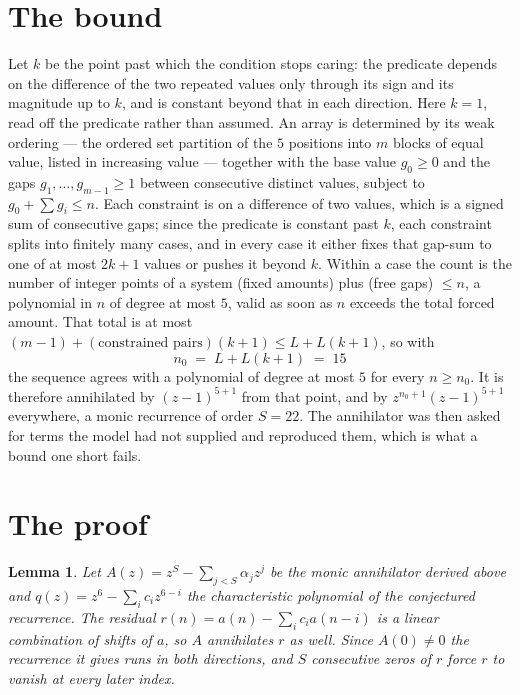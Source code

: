 \documentclass[11pt,a4paper]{article}
\theoremstyle{plain}
\newtheorem{lemma}[theorem]{Lemma}
\theoremstyle{definition}
\begin{document}
\section{The bound}

Let $k$ be the point past which the condition stops caring: the predicate depends on the
difference of the two repeated values only through its sign and its magnitude up to $k$, and is
constant beyond that in each direction. Here $k=1$, read off the predicate rather than
assumed. An array is determined by its weak ordering --- the ordered set partition of the
$5$ positions into $m$ blocks of equal value, listed in increasing value --- together with
the base value $g_0\ge0$ and the gaps $g_1,\dots,g_{m-1}\ge1$ between consecutive distinct
values, subject to $g_0+\sum g_i\le n$. Each constraint is on a difference of two values, which
is a signed sum of consecutive gaps; since the predicate is constant past $k$, each constraint
splits into finitely many cases, and in every case it either fixes that gap-sum to one of at
most $2k+1$ values or pushes it beyond $k$. Within a case the count is the number of integer
points of a system (fixed amounts) plus (free gaps) $\le n$, a polynomial in $n$ of degree at
most $5$, valid as soon as $n$ exceeds the total forced amount. That total is at most
$(m-1)+(\text{constrained pairs})(k+1)\le L+L(k+1)$, so with
\[
n_0 \;=\; L + L(k+1) \;=\; 15
\]
the sequence agrees with a polynomial of degree at most $5$ for every $n\ge n_0$. It is
therefore annihilated by $(z-1)^{5+1}$ from that point, and by $z^{n_0+1}(z-1)^{5+1}$
everywhere, a monic recurrence of order $S=22$. The annihilator was then asked for terms the
model had not supplied and reproduced them, which is what a bound one short fails.

\section{The proof}

\begin{lemma}\label{lem:crit}
Let $A(z)=z^S-\sum_{j<S}\alpha_jz^{j}$ be the monic annihilator derived above and
$q(z)=z^{6}-\sum_ic_iz^{6-i}$ the characteristic polynomial of the conjectured
recurrence. The residual $r(n)=a(n)-\sum_ic_ia(n-i)$ is a linear combination of shifts of $a$,
so $A$ annihilates $r$ as well. Since $A(0)\ne0$ the recurrence it gives runs in both
directions, and $S$ consecutive zeros of $r$ force $r$ to vanish at every later index.
\end{lemma}
\end{document}
